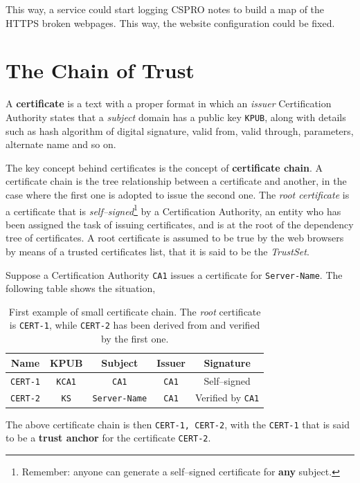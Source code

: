 \documentclass[10pt]{extreport}
\begin{document}
This way, a service could start logging CSPRO notes to build a map of the
HTTPS broken webpages. This way, the website configuration could be fixed.

\section{The Chain of Trust}

A \textbf{certificate} is a text with a proper format in which an \emph{issuer}
Certification Authority states that a \emph{subject} domain has a public key
\texttt{KPUB}, along with details such as hash algorithm of digital signature,
valid from, valid through, parameters, alternate name and so on.

The key concept behind certificates is the concept of \textbf{certificate
chain}. A certificate chain is the tree relationship between a certificate and
another, in the case where the first one is adopted to issue the second one.
The \emph{root certificate} is a certificate that is
\emph{self--signed}\footnote{Remember: anyone can generate a self--signed certificate
for \textbf{any} subject.} by a Certification Authority, an entity who has been
assigned the task of issuing certificates, and is at the root of the dependency
tree of certificates. A root certificate is assumed to be true by the web
browsers by means of a trusted certificates list, that it is said to be the
\emph{TrustSet}.

Suppose a Certification Authority \texttt{CA1} issues a certificate for
\texttt{Server\--Name}. The following table shows the situation,
\begin{table}[ht]
\centering
\begin{tabular}{ccccc}
    \textbf{Name} & \textbf{KPUB} & \textbf{Subject} & \textbf{Issuer} & \textbf{Signature} \\
    \hline
    \texttt{CERT-1} & \texttt{KCA1} & \texttt{CA1} & \texttt{CA1} & Self--signed \\
    \texttt{CERT-2} & \texttt{KS} & \texttt{Server-Name} & \texttt{CA1} & Verified by \texttt{CA1}
\end{tabular}
\caption{First example of small certificate chain. The \emph{root} certificate
    is \texttt{CERT-1}, while \texttt{CERT-2} has been derived from and
    verified by the first one.}\label{tab:certificateChain1}
\end{table}
\bigskip

The above certificate chain is then \texttt{CERT-1, CERT-2}, with the
\texttt{CERT-1} that is said to be a \textbf{trust anchor} for the certificate
\texttt{CERT-2}.
\end{document}
